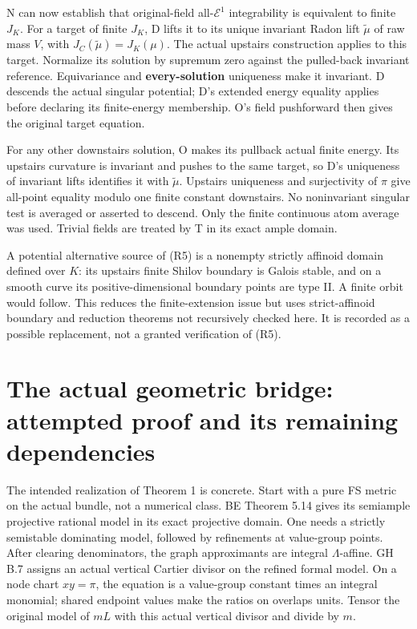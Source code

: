 \documentclass[
  11pt,
]{article}
\begin{document}
N can now establish that original-field all-\(\mathcal E^1\)
integrability is equivalent to finite \(J_K\). For a target of finite
\(J_K\), D lifts it to its unique invariant Radon lift \(\widetilde\mu\)
of raw mass \(V\), with \(J_C(\widetilde\mu)=J_K(\mu)\). The actual
upstairs construction applies to this target. Normalize its solution by
supremum zero against the pulled-back invariant reference. Equivariance
and \textbf{every-solution} uniqueness make it invariant. D descends the
actual singular potential; D's extended energy equality applies before
declaring its finite-energy membership. O's field pushforward then gives
the original target equation.

For any other downstairs solution, O makes its pullback actual finite
energy. Its upstairs curvature is invariant and pushes to the same
target, so D's uniqueness of invariant lifts identifies it with
\(\widetilde\mu\). Upstairs uniqueness and surjectivity of \(\pi\) give
all-point equality modulo one finite constant downstairs. No
noninvariant singular test is averaged or asserted to descend. Only the
finite continuous atom average was used. Trivial fields are treated by T
in its exact ample domain.

A potential alternative source of (R5) is a nonempty strictly affinoid
domain defined over \(K\): its upstairs finite Shilov boundary is Galois
stable, and on a smooth curve its positive-dimensional boundary points
are type II. A finite orbit would follow. This reduces the
finite-extension issue but uses strict-affinoid boundary and reduction
theorems not recursively checked here. It is recorded as a possible
replacement, not a granted verification of (R5).

\section{The actual geometric bridge: attempted proof and its remaining
dependencies}\label{the-actual-geometric-bridge-attempted-proof-and-its-remaining-dependencies}

The intended realization of Theorem 1 is concrete. Start with a pure FS
metric on the actual bundle, not a numerical class. BE Theorem 5.14
gives its semiample projective rational model in its exact projective
domain. One needs a strictly semistable dominating model, followed by
refinements at value-group points. After clearing denominators, the
graph approximants are integral \(\Lambda\)-affine. GH B.7 assigns an
actual vertical Cartier divisor on the refined formal model. On a node
chart \(xy=\pi\), the equation is a value-group constant times an
integral monomial; shared endpoint values make the ratios on overlaps
units. Tensor the original model of \(mL\) with this actual vertical
divisor and divide by \(m\).
\end{document}
